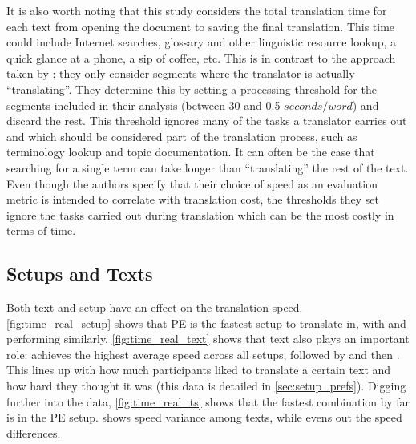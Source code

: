 It is also worth noting that this study considers the total translation time for each text from opening the document to saving the final translation. This time could include Internet searches, glossary and other linguistic resource lookup, a quick glance at a phone, a sip of coffee, etc. This is in contrast to the approach taken by \textcite{federico2012measuring}: they only consider segments where the translator is actually ``translating''. They determine this by setting a processing threshold for the segments included in their analysis (between 30 and 0.5 $seconds/word$) and discard the rest. This threshold ignores many of the tasks a translator carries out and which should be considered part of the translation process, such as terminology lookup and topic documentation. It can often be the case that searching for a single term can take longer than ``translating'' the rest of the text. Even though the authors specify that their choice of speed as an evaluation metric is intended to correlate with translation cost, the thresholds they set ignore the tasks carried out during translation which can be the most costly in terms of time.

\subsection{Setups and Texts}

\noindent Both text and setup have an effect on the translation speed. \autoref{fig:time_real_setup} shows that \ac{PE} is the fastest setup to translate in, with \scratch and \style performing similarly. \autoref{fig:time_real_text} shows that text also plays an important role: \garfield achieves the highest average speed across all setups, followed by \ai and then \charlotte. This lines up with how much participants liked to translate a certain text and how hard they thought it was (this data is detailed in \autoref{sec:setup_prefs}). Digging further into the data, \autoref{fig:time_real_ts} shows that the fastest combination by far is \garfield in the \ac{PE} setup. \scratch shows speed variance among texts, while \style evens out the speed differences.

